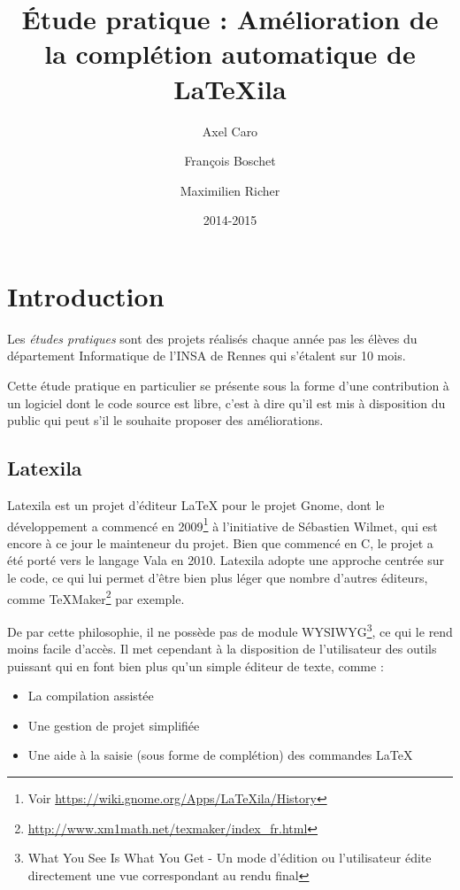 \documentclass[a4paper,11pt]{report}
\title{Étude pratique : Amélioration de la complétion automatique de \LaTeX{}ila}
\author{Axel Caro\and François Boschet\and Maximilien Richer}
\date{2014-2015}
\begin{document}


\maketitle %
\tableofcontents %
\newpage

\chapter{Introduction}
\label{cha:Introduction}

Les \textit{études pratiques} sont des projets réalisés chaque année pas les élèves du département Informatique de l'INSA de Rennes qui s'étalent sur 10 mois.

Cette étude pratique en particulier se présente sous la forme d'une contribution à un logiciel dont le code source est libre, c'est à dire qu'il est mis à disposition du public qui peut s'il le souhaite proposer des améliorations.

\section{Latexila}
\label{sec:latexila}
Latexila est un projet d'éditeur LaTeX pour le projet Gnome, dont le développement a commencé en 2009\footnote{Voir \url{https://wiki.gnome.org/Apps/LaTeXila/History}} à l'initiative de Sébastien Wilmet, qui est encore à ce jour le mainteneur du projet.
Bien que commencé en C, le projet a été porté vers le langage Vala en 2010. Latexila adopte une approche centrée sur le code, ce qui lui permet d'être bien plus léger que nombre d'autres éditeurs, comme TeXMaker\footnote{\url{http://www.xm1math.net/texmaker/index_fr.html}} par exemple.

De par cette philosophie, il ne possède pas de module WYSIWYG\footnote{What You See Is What You Get - Un mode d'édition ou l'utilisateur édite directement une vue correspondant au rendu final}, ce qui le rend moins facile d'accès.
Il met cependant à la disposition de l'utilisateur des outils puissant qui en font bien plus qu'un simple éditeur de texte, comme :

\begin{itemize}
	\item La compilation assistée
	\item Une gestion de projet simplifiée
	\item Une aide à la saisie (sous forme de complétion) des commandes \LaTeX
\end{itemize}
\end{document}
